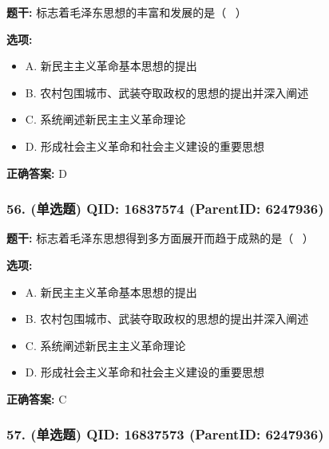 \documentclass[12pt,UTF8]{ctexart}
\begin{document}
\textbf{题干:}
标志着毛泽东思想的丰富和发展的是（  ）



\textbf{选项:}
\begin{itemize}[leftmargin=*]

  \item A. 新民主主义革命基本思想的提出

  \item B. 农村包围城市、武装夺取政权的思想的提出并深入阐述

  \item C. 系统阐述新民主主义革命理论

  \item D. 形成社会主义革命和社会主义建设的重要思想

\end{itemize}

\textbf{正确答案:}
D

\vspace{0.3em}\hrulefill\vspace{0.7em}

\subsubsection*{56. (单选题) \small QID: 16837574 (ParentID: 6247936)}

\textbf{题干:}
标志着毛泽东思想得到多方面展开而趋于成熟的是（  ）



\textbf{选项:}
\begin{itemize}[leftmargin=*]

  \item A. 新民主主义革命基本思想的提出

  \item B. 农村包围城市、武装夺取政权的思想的提出并深入阐述

  \item C. 系统阐述新民主主义革命理论

  \item D. 形成社会主义革命和社会主义建设的重要思想

\end{itemize}

\textbf{正确答案:}
C

\vspace{0.3em}\hrulefill\vspace{0.7em}

\subsubsection*{57. (单选题) \small QID: 16837573 (ParentID: 6247936)}
\end{document}
